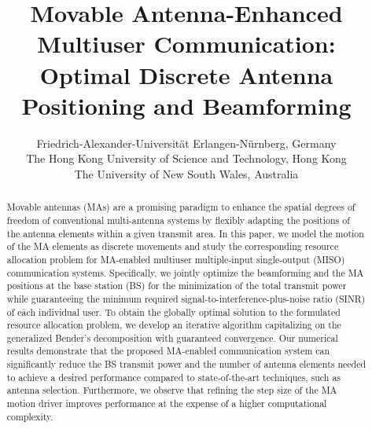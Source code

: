 \documentclass[12pt, draftclsnofoot, onecolumn]{IEEEtran}
\title{Movable Antenna-Enhanced Multiuser Communication: Optimal Discrete Antenna Positioning and Beamforming}
\author{\IEEEauthorblockN {Yifei Wu\IEEEauthorrefmark{1}, Dongfang Xu\IEEEauthorrefmark{2}, Derrick Wing Kwan Ng\IEEEauthorrefmark{3}, Wolfgang Gerstacker\IEEEauthorrefmark{1}, and Robert Schober\IEEEauthorrefmark{1}}



\IEEEauthorrefmark {1}Friedrich-Alexander-Universit\"at
Erlangen-N\"urnberg, Germany\\
\IEEEauthorrefmark {2}The Hong Kong University of Science and Technology, Hong Kong\\
\IEEEauthorrefmark {3}The University
of New South Wales, Australia%
}
\begin{document}
\maketitle
\begin{abstract}
    Movable antennas (MAs) are a promising paradigm to enhance the spatial degrees of freedom of conventional multi-antenna systems by flexibly adapting the positions of the antenna elements within a given transmit area. In this paper, we model the motion of the MA elements as discrete movements and study the corresponding resource allocation problem for MA-enabled multiuser multiple-input single-output (MISO) communication systems. Specifically, we jointly optimize the beamforming and the MA positions at the base station (BS) for the minimization of the total transmit power while guaranteeing the minimum required signal-to-interference-plus-noise ratio (SINR) of each individual user. To obtain the globally optimal solution to the formulated resource allocation problem, we develop an iterative algorithm capitalizing on the generalized Bender's decomposition with guaranteed convergence. Our numerical results demonstrate that the proposed MA-enabled communication system can significantly reduce the BS transmit power and the number of antenna elements needed to achieve a desired performance compared to state-of-the-art techniques, such as antenna selection. Furthermore, we observe that refining the step size of the MA motion driver improves performance at the expense of a higher computational complexity.
\end{abstract}
\end{document}
